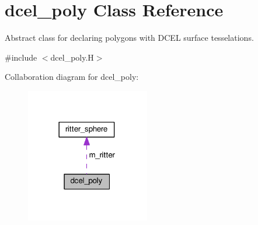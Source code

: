 \hypertarget{classdcel__poly}{}\section{dcel\+\_\+poly Class Reference}
\label{classdcel__poly}


Abstract class for declaring polygons with D\+C\+EL surface tesselations.  




{\ttfamily \#include $<$dcel\+\_\+poly.\+H$>$}



Collaboration diagram for dcel\+\_\+poly\+:\nopagebreak
\begin{figure}[H]
\begin{center}
\leavevmode
\includegraphics[width=153pt]{classdcel__poly__coll__graph}
\end{center}
\end{figure}
